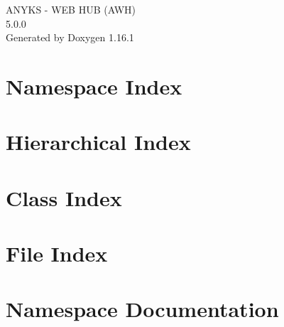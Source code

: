 \documentclass[twoside]{book}
\newcommand{\+}{\discretionary{\mbox{\scriptsize$\hookleftarrow$}}{}{}}
\newcommand{\clearemptydoublepage}{%
    \newpage{\pagestyle{empty}\cleardoublepage}%
  }
\begin{document}
  \raggedbottom
    \hypersetup{pageanchor=false,
                bookmarksnumbered=true,
                pdfencoding=unicode
               }
  \begin{titlepage}
  \vspace*{7cm}
  \begin{center}%
  {\Large ANYKS -\/ WEB HUB (\+AWH)}\\
  [1ex]\large 5.\+0.\+0 \\
  \vspace*{1cm}
  {\large Generated by Doxygen 1.16.1}\\
  \end{center}
  \end{titlepage}
  \clearemptydoublepage
  \tableofcontents
  \clearemptydoublepage
  \hypersetup{pageanchor=true}
\chapter{Namespace Index}

\chapter{Hierarchical Index}

\chapter{Class Index}

\chapter{File Index}

\chapter{Namespace Documentation}





\end{document}
